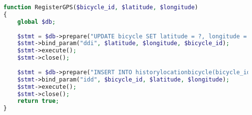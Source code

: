 \begin{lstlisting}[language=PHP, caption={The function that records the location of a bicycle.}, label=lst:registergps]
function RegisterGPS($bicycle_id, $latitude, $longitude)
{
    global $db;
    
    $stmt = $db->prepare("UPDATE bicycle SET latitude = ?, longitude = ? WHERE bicycle_id = ?");
    $stmt->bind_param("ddi", $latitude, $longitude, $bicycle_id);
    $stmt->execute();
    $stmt->close();
    
    $stmt = $db->prepare("INSERT INTO historylocationbicycle(bicycle_id, latitude, longitude) VALUES (?,?,?)");
    $stmt->bind_param("idd", $bicycle_id, $latitude, $longitude);
    $stmt->execute();
    $stmt->close();
    return true;
}
\end{lstlisting}